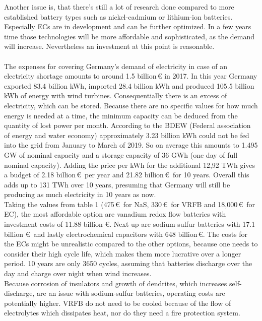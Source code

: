 \begin{parcolumns}[colwidths={1=2.5 cm, 2=10 cm, 3=2.5cm}]{3}
{Another issue is, that there's still a lot of research done compared to more established battery types such as nickel-cadmium or lithium-ion batteries. Especially ECs are in development and can be further optimized. In a few years time those technologies will be more affordable and sophisticated, as the demand will increase. Nevertheless an investment at this point is reasonable. 
\\\\
The expenses for covering Germany's demand of electricity in case of an electricity shortage amounts to around 1.5 billion\,\euro\,\,in 2017. In this year Germany exported 83.4 billion kWh, imported 28.4 billion kWh and produced 105.5 billion kWh of energy with wind turbines. Consequentially there is an excess of electricity, which can be stored. Because there are no specific values for how much energy is needed at a time, the minimum capacity can be deduced from the quantity of lost power per month. According to the BDEW (Federal association of energy and water economy) approximately 3.23 billion kWh could not be fed into the grid from January to March of 2019. So on average this amounts to 1.495 GW of nominal capacity and a storage capacity of 36 GWh (one day of full nominal capacity). Adding the price per kWh for the additional 12,92 TWh gives a budget of 2.18 billion\,\euro\, per year and 21.82 billion\,\euro\, for 10 years. Overall this adds up to 131 TWh over 10 years, presuming that Germany will still be producing as much electricity in 10 years as now.  \\
Taking the values from table 1 (475\,\euro\, for NaS, 330\,\euro\, for VRFB and 18,000\,\euro\, for EC), the most affordable option are vanadium redox flow batteries with investment costs of 11.88 billion \euro. Next up are sodium-sulfur batteries with 17.1 billion \euro\, and lastly electrochemical capacitors with 648 billion\,\euro. The costs for the ECs might be unrealistic compared to the other options, because one needs to consider their high cycle life, which makes them more lucrative over a longer period. 10 years are only 3650 cycles, assuming that batteries discharge over the day and charge over night when wind increases. \\
Because corrosion of insulators and growth of dendrites, which increases self-discharge, are an issue with sodium-sulfur batteries, operating costs are potentially higher. VRFB do not need to be cooled because of the flow of electrolytes which dissipates heat, nor do they need a fire protection system. \\\\
}
\end{parcolumns}
